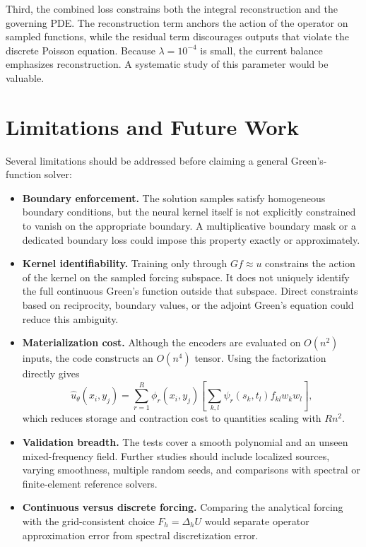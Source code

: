 \documentclass[11pt,a4paper]{article}
\newcommand{\uhat}{\widehat{u}_{\theta}}
\begin{document}
Third, the combined loss constrains both the integral reconstruction and the governing PDE. The reconstruction term anchors the action of the operator on sampled functions, while the residual term discourages outputs that violate the discrete Poisson equation. Because $\lambda=10^{-4}$ is small, the current balance emphasizes reconstruction. A systematic study of this parameter would be valuable.

\section{Limitations and Future Work}
\label{sec:limitations}

Several limitations should be addressed before claiming a general Green's-function solver:

\begin{itemize}[leftmargin=2em]
  \item \textbf{Boundary enforcement.} The solution samples satisfy homogeneous boundary conditions, but the neural kernel itself is not explicitly constrained to vanish on the appropriate boundary. A multiplicative boundary mask or a dedicated boundary loss could impose this property exactly or approximately.
  \item \textbf{Kernel identifiability.} Training only through $Gf\approx u$ constrains the action of the kernel on the sampled forcing subspace. It does not uniquely identify the full continuous Green's function outside that subspace. Direct constraints based on reciprocity, boundary values, or the adjoint Green's equation could reduce this ambiguity.
  \item \textbf{Materialization cost.} Although the encoders are evaluated on $O(n^2)$ inputs, the code constructs an $O(n^4)$ tensor. Using the factorization directly gives
  \begin{equation}
    \uhat(x_i,y_j)=\sum_{r=1}^{R}\phi_r(x_i,y_j)
    \left[\sum_{k,l}\psi_r(s_k,t_l)f_{kl}w_kw_l\right],
  \end{equation}
  which reduces storage and contraction cost to quantities scaling with $Rn^2$.
  \item \textbf{Validation breadth.} The tests cover a smooth polynomial and an unseen mixed-frequency field. Further studies should include localized sources, varying smoothness, multiple random seeds, and comparisons with spectral or finite-element reference solvers.
  \item \textbf{Continuous versus discrete forcing.} Comparing the analytical forcing with the grid-consistent choice $F_h=\Delta_hU$ would separate operator approximation error from spectral discretization error.
\end{itemize}
\end{document}
